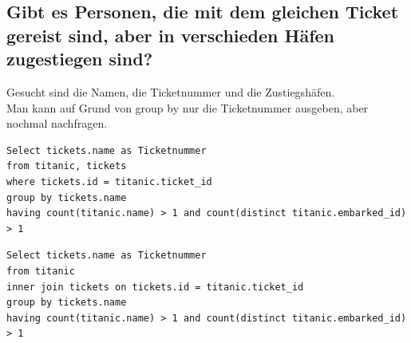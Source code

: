 \documentclass[a4paper, 11pt, titlepage]{article}
\begin{document}
\subsection{Gibt es Personen, die mit dem gleichen Ticket gereist sind, aber in verschieden Häfen 
zugestiegen sind?}
Gesucht sind die Namen, die Ticketnummer und die Zustiegshäfen.\\
Man kann auf Grund von group by nur die Ticketnummer ausgeben, aber nochmal nachfragen.
\begin{lstlisting}[style = sql]
Select tickets.name as Ticketnummer
from titanic, tickets
where tickets.id = titanic.ticket_id
group by tickets.name
having count(titanic.name) > 1 and count(distinct titanic.embarked_id) > 1
\end{lstlisting}
\begin{lstlisting}[style = sql]
Select tickets.name as Ticketnummer
from titanic
inner join tickets on tickets.id = titanic.ticket_id
group by tickets.name
having count(titanic.name) > 1 and count(distinct titanic.embarked_id) > 1
\end{lstlisting}
\end{document}
